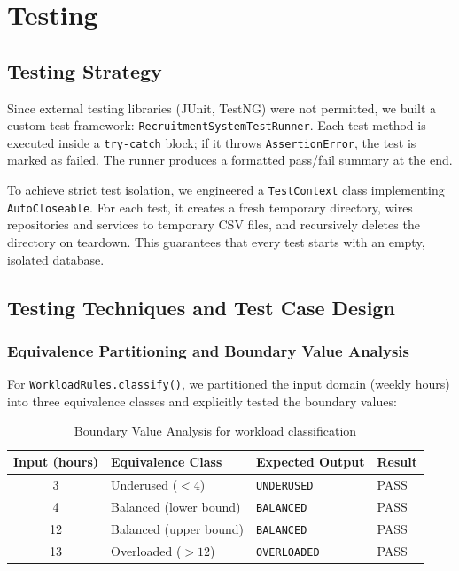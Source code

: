 \documentclass[12pt, a4paper]{article}
\begin{document}
\section{Testing}

\subsection{Testing Strategy}
Since external testing libraries (JUnit, TestNG) were not permitted, we built a custom test framework: \texttt{RecruitmentSystemTestRunner}. Each test method is executed inside a \texttt{try-catch} block; if it throws \texttt{AssertionError}, the test is marked as failed. The runner produces a formatted pass/fail summary at the end.

To achieve strict test isolation, we engineered a \texttt{TestContext} class implementing \texttt{AutoCloseable}. For each test, it creates a fresh temporary directory, wires repositories and services to temporary CSV files, and recursively deletes the directory on teardown. This guarantees that every test starts with an empty, isolated database.

\subsection{Testing Techniques and Test Case Design}

\subsubsection{Equivalence Partitioning and Boundary Value Analysis}
For \texttt{WorkloadRules.classify()}, we partitioned the input domain (weekly hours) into three equivalence classes and explicitly tested the boundary values:

\begin{table}[H]
\centering
\renewcommand{\arraystretch}{1.3}
\begin{tabular}{|c|l|l|l|}
\hline
\textbf{Input (hours)} & \textbf{Equivalence Class} & \textbf{Expected Output} & \textbf{Result} \\ \hline
3 & Underused ($< 4$) & \texttt{UNDERUSED} & PASS \\ \hline
4 & Balanced (lower bound) & \texttt{BALANCED} & PASS \\ \hline
12 & Balanced (upper bound) & \texttt{BALANCED} & PASS \\ \hline
13 & Overloaded ($> 12$) & \texttt{OVERLOADED} & PASS \\ \hline
\end{tabular}
\caption{Boundary Value Analysis for workload classification}
\end{table}
\end{document}
